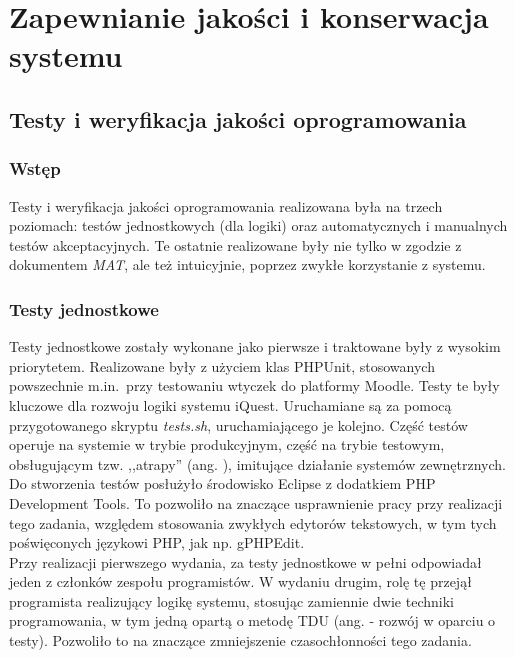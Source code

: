 \chapter{Zapewnianie jakości i konserwacja systemu}
\label{Chapter7}

\section{Testy i weryfikacja jakości oprogramowania}
\label{Chapter71}

\subsection{Wstęp}
\label{Chapter711}

Testy i weryfikacja jakości oprogramowania realizowana była na trzech poziomach: testów jednostkowych (dla logiki) oraz automatycznych i manualnych testów akceptacyjnych. Te ostatnie realizowane były nie tylko w zgodzie z dokumentem \textit{MAT}\cite{Redmine:ProjDocs}, ale też intuicyjnie, poprzez zwykłe korzystanie z systemu.

\subsection{Testy jednostkowe}
\label{Chapter712}

Testy jednostkowe zostały wykonane jako pierwsze i traktowane były z wysokim priorytetem. Realizowane były z użyciem klas PHPUnit, stosowanych powszechnie m.in.~przy testowaniu wtyczek do platformy Moodle. Testy te były kluczowe dla rozwoju logiki systemu iQuest. Uruchamiane są za pomocą przygotowanego skryptu \textit{tests.sh}, uruchamiającego je kolejno. Część testów operuje na systemie w trybie produkcyjnym, część na trybie testowym, obsługującym tzw. ,,atrapy'' (ang. ), imitujące działanie systemów zewnętrznych. \\

Do stworzenia testów posłużyło środowisko Eclipse z dodatkiem PHP Development Tools. To pozwoliło na znaczące usprawnienie pracy przy realizacji tego zadania, względem stosowania zwykłych edytorów tekstowych, w tym tych poświęconych językowi PHP, jak np. gPHPEdit. \\

Przy realizacji pierwszego wydania, za testy jednostkowe w pełni odpowiadał jeden z członków zespołu programistów. W wydaniu drugim, rolę tę przejął programista realizujący logikę systemu, stosując zamiennie dwie techniki programowania, w tym jedną opartą o metodę TDU (ang.  - rozwój w oparciu o testy). Pozwoliło to na znaczące zmniejszenie czasochłonności tego zadania.

